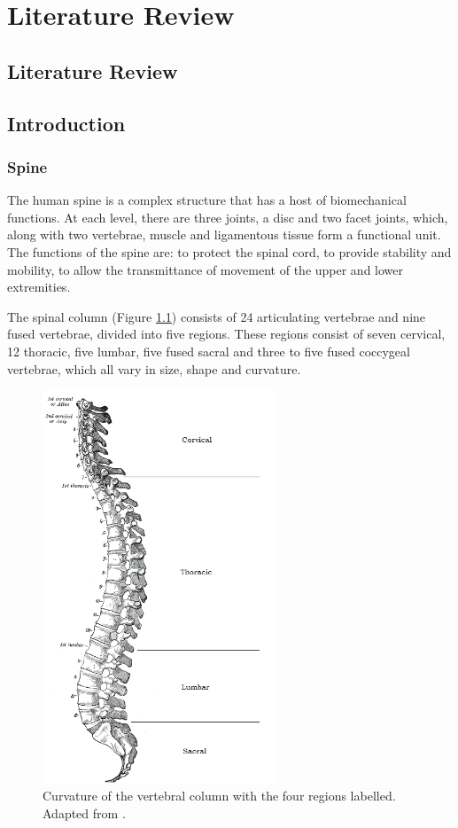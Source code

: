\chapter{Literature Review}
\section{Literature Review}\label{introduction}
\section{Introduction}
\subsection{Spine}\label{spine}

The human spine is a complex structure that has a host of biomechanical
functions. At each level, there are three joints, a disc and two facet
joints, which, along with two vertebrae, muscle and ligamentous tissue
form a functional unit. The functions of the spine are: to protect the spinal cord,
 to provide stability and mobility, to allow the transmittance of
movement of the upper and lower extremities.

The spinal column (Figure \ref{fig:spine}) consists of 24
articulating
vertebrae
and nine
fused
vertebrae, divided into five regions. These regions consist of seven
cervical, 12 thoracic, five lumbar, five fused sacral and three to five
fused coccygeal vertebrae, which all vary in size, shape and curvature.

\begin{figure}[hbt]

\centering
  \includegraphics[width=7cm]{images/spine.png}
  \caption{Curvature of the vertebral column with the four regions labelled.
Adapted from \cite{Gray1918}.}
\label{fig:spine}
\end{figure}




